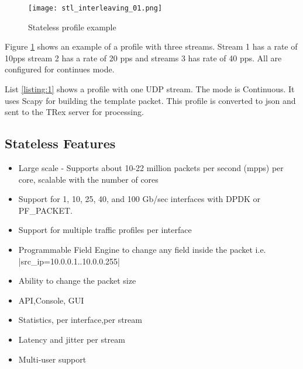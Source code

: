 \documentclass[conference]{IEEEtran}
\begin{document}
\begin{figure}[h]
  \texttt{[image: stl\_interleaving\_01.png]}
  \caption{Stateless profile example}
  \label{fig:stlhello}
\end{figure}

Figure \ref{fig:stlhello} shows an example of a profile with three streams.  
Stream 1 has a rate of 10pps stream 2 has a rate of 20 pps and streams 3 has rate of 40 pps. All are configured for continues mode.

List \ref{listing:1} shows a profile with one UDP stream. The mode is Continuous. 
It uses Scapy for building the template packet. This profile is converted to json and sent to the TRex server for processing. 

  
\subsection{Stateless Features}

\begin{itemize}
  \item Large scale - Supports about 10-22 million packets per second (mpps) per core, scalable with the number of cores
  \item Support for 1, 10, 25, 40, and 100 Gb/sec interfaces with DPDK or PF\_PACKET.
  \item Support for multiple traffic profiles per interface
  \item Programmable Field Engine to change any field inside the packet i.e. |src_ip=10.0.0.1..10.0.0.255|
  \item Ability to change the packet size 
  \item API,Console, GUI
  \item Statistics, per interface,per stream 
  \item Latency and jitter per stream
  \item Multi-user support 
\end{itemize}
\end{document}

